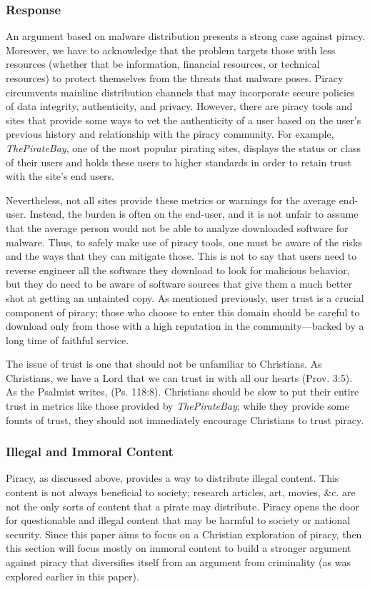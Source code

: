 \documentclass[onecolumn, 12pt]{article}
\begin{document}
\begin{refsection}
\subsubsection{Response}
An argument based on malware distribution presents a strong case against piracy.
Moreover, we have to acknowledge that the problem targets those with less
resources (whether that be information, financial resources, or technical
resources) to protect themselves from the threats that malware poses. Piracy
circumvents mainline distribution channels that may incorporate secure policies
of data integrity, authenticity, and privacy. However, there are piracy tools
and sites that provide some ways to vet the authenticity of a user based on the
user's previous history and relationship with the piracy community. For example,
\emph{ThePirateBay}, one of the most popular pirating sites, displays the status
or class of their users and holds these users to higher standards in order to
retain trust with the site's end users.~\cite{suprbay:status}

Nevertheless, not all sites provide these metrics or warnings for the average
end-user. Instead, the burden is often on the end-user, and it is not unfair to
assume that the average person would not be able to analyze downloaded software
for malware. Thus, to safely make use of piracy tools, one must be aware of the
risks and the ways that they can mitigate those. This is not to say that users
need to reverse engineer all the software they download to look for malicious
behavior, but they do need to be aware of software sources that give them a
much better shot at getting an untainted copy. As mentioned previously, user
trust is a crucial component of piracy; those who choose to enter this domain
should be careful to download only from those with a high reputation in the
community---backed by a long time of faithful service.

The issue of trust is one that should not be unfamiliar to Christians. As
Christians, we have a Lord that we can trust in with all our hearts (Prov. 3:5).
As the Psalmist writes,  (Ps. 118:8). Christians should be slow to put their entire
trust in metrics like those provided by \emph{ThePirateBay}; while they provide
some founts of trust, they should not immediately encourage Christians to trust
piracy.

\subsubsection{Illegal and Immoral Content}
Piracy, as discussed above, provides a way to distribute illegal content. This
content is not always beneficial to society; research articles, art, movies, \&c.
are not the only sorts of content that a pirate may distribute. Piracy opens
the door for questionable and illegal content that may be harmful to society
or national security. Since this paper aims to focus on a Christian exploration
of piracy, then this section will focus mostly on immoral content to build a
stronger argument against piracy that diversifies itself from an argument from
criminality (as was explored earlier in this paper).


\end{refsection}
\end{document}
